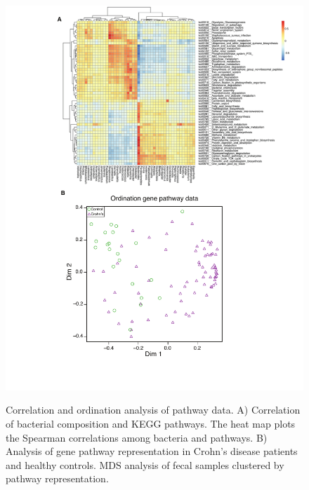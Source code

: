 \begin{figure}[p]
	\centering
	{\includegraphics[scale=0.7,trim=0 40 0 0,clip]{Figure/F2S2_gene_heatmap.pdf}}
	\caption[Correlation of bacterial composition and KEGG pathways]{Correlation and ordination analysis of pathway data. A) Correlation of bacterial composition and KEGG pathways. The heat map plots the Spearman correlations among bacteria and pathways. B) Analysis of gene pathway representation in Crohn's disease patients and healthy controls. MDS analysis of fecal samples clustered by pathway representation. 
	}
	\label{F2S2_gene_heatmap}
\end{figure}




